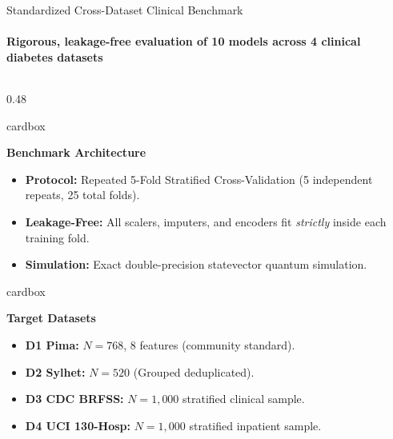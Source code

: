 \documentclass[aspectratio=169, 10pt]{beamer}
\newcommand{\cardbox}[3]{%
  \begin{beamercolorbox}[wd=\linewidth,rounded=true,sep=2.5pt]{cardbox}%
    {\bfseries\scriptsize\color{#1}#2\par}\vspace*{1pt}%
    {\footnotesize #3}%
  \end{beamercolorbox}%
}
\begin{document}
\begin{frame}{Standardized Cross-Dataset Clinical Benchmark}
  \framesubtitle{Rigorous, leakage-free evaluation of 10 models across 4 clinical diabetes datasets}

  \begin{columns}[T]
    \begin{column}{0.48\textwidth}
      \cardbox{DeepPurple}{Benchmark Architecture}{
        \begin{itemize}\setlength\itemsep{1pt}\scriptsize
          \item \textbf{Protocol:} Repeated 5-Fold Stratified Cross-Validation (5 independent repeats, 25 total folds).
          \item \textbf{Leakage-Free:} All scalers, imputers, and encoders fit \textit{strictly} inside each training fold.
          \item \textbf{Simulation:} Exact double-precision statevector quantum simulation.
        \end{itemize}
      }
      \vspace*{3pt}
      \cardbox{MedPurple}{Target Datasets}{
        \begin{itemize}\setlength\itemsep{1pt}\scriptsize
          \item \textbf{D1 Pima:} $N=768$, 8 features (community standard).
          \item \textbf{D2 Sylhet:} $N=520$ (Grouped deduplicated).
          \item \textbf{D3 CDC BRFSS:} $N=1,000$ stratified clinical sample.
          \item \textbf{D4 UCI 130-Hosp:} $N=1,000$ stratified inpatient sample.
        \end{itemize}
      }
    \end{column}


\end{columns}
\end{frame}
\end{document}
